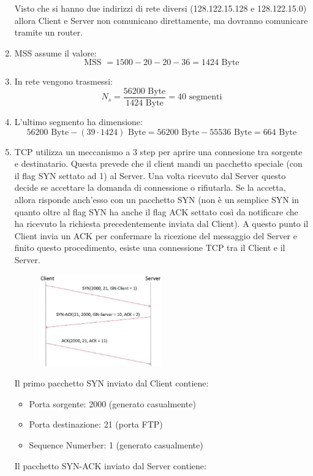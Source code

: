 \documentclass[10pt]{article}
\begin{document}
\begin{enumerate}
		Visto che si hanno due indirizzi di rete diversi (128.122.15.128 e 128.122.15.0) allora Client e Server non comunicano direttamente, ma dovranno comunicare tramite un router.
		\item MSS assume il valore: $$\textrm{MSS } = 1500 - 20 - 20 - 36 = 1424 \textrm{ Byte}$$
		\item In rete vengono trasmessi:
		$$ N_{s} =  \frac{56200 \textrm{ Byte}}{1424 \textrm{ Byte}} = 40 \textrm{ segmenti}$$
		\item L'ultimo segmento ha dimensione: 
		$$56200 \textrm{ Byte} - (39 \cdot 1424) \textrm{ Byte} = 56200 \textrm{ Byte} - 55536 \textrm{ Byte} = 664 \textrm{ Byte}$$
		\item TCP utilizza un meccanismo a 3 step per aprire una connesione tra sorgente e destinatario. Questa prevede che il client mandi un pacchetto speciale (con il flag SYN settato ad 1) al Server. Una volta ricevuto dal Server questo decide se accettare la domanda di connessione o rifiutarla. 
		Se la accetta, allora risponde anch'esso con un pacchetto SYN (non è un semplice SYN in quanto oltre al flag SYN ha anche il flag ACK settato così da notificare che ha ricevuto la richiesta precedentemente inviata dal Client). A questo punto il Client invia un ACK per confermare la ricezione 
		del messaggio del Server e finito questo procedimento, esiste una connessione TCP tra il Client e il Server.
		\begin{figure}[H]
			\centering
			\includegraphics[width=0.5\textwidth]{ConnectionSetup_12062019}
		\end{figure}
		Il primo pacchetto SYN inviato dal Client contiene:
		\begin{itemize}
			\item Porta sorgente: 2000 (generato casualmente)
			\item Porta destinazione: 21 (porta FTP)
			\item Sequence Numerber: 1 (generato casualmente)
		\end{itemize}
		Il pacchetto SYN-ACK inviato dal Server contiene:

\end{enumerate}
\end{document}
